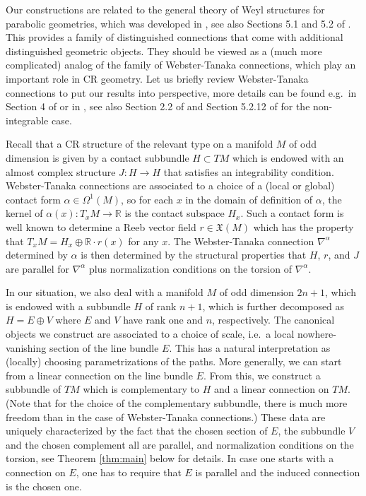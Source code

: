 \documentclass[11pt]{amsart}
\numberwithin{proposition}{section}
\numberwithin{equation}{section}
\begin{document}
Our constructions are related to the general theory of Weyl structures for parabolic geometries, which was developed in \cite{Weyl}, see also Sections 5.1 and 5.2 of \cite{Book}. This provides a family of distinguished connections that come with additional distinguished geometric objects. They should be viewed as a (much more complicated) analog of the family of Webster-Tanaka connections, which play an important role in CR geometry. Let us briefly review Webster-Tanaka connections to put our results into perspective, more details can be found e.g.\ in Section 4 of \cite{Lee} or in \cite{Go-Gr}, see also Section 2.2 of \cite{Arman} and Section 5.2.12 of \cite{Book} for the non-integrable case. 

Recall that a CR structure of the relevant type on a manifold $M$ of odd dimension is given by a contact subbundle $H\subset TM$ which is endowed with an almost complex structure $J:H\to H$ that satisfies an integrability condition. Webster-Tanaka connections are associated to a choice of a (local or global) contact form  $\alpha\in\Omega^1(M)$, so for each $x$ in the domain of definition of $\alpha$, the kernel of $\alpha(x):T_xM\to\mathbb R$ is the contact subspace $H_x$. Such a contact form is well known to determine a Reeb vector field $r\in\mathfrak X(M)$ which has the property that $T_xM=H_x\oplus\mathbb R\cdot r(x)$ for any $x$. The Webster-Tanaka connection $\nabla^\alpha$ determined by $\alpha$ is then determined by the structural properties that $H$, $r$, and $J$ are parallel for $\nabla^\alpha$ plus normalization conditions on the torsion of $\nabla^\alpha$. 

In our situation, we also deal with a manifold $M$ of odd dimension $2n+1$, which is endowed with a subbundle $H$ of rank $n+1$, which is further decomposed as $H=E\oplus V$ where $E$ and $V$ have rank one and $n$, respectively. The canonical objects we construct are associated to a choice of scale, i.e.\ a local nowhere-vanishing section of the line bundle $E$. This has a natural interpretation as (locally) choosing parametrizations of the paths. More generally, we can start from a linear connection on the line bundle $E$. From this, we construct a subbundle of $TM$ which is complementary to $H$ and a linear connection on $TM$. (Note that for the choice of the complementary subbundle, there is much more freedom than in the case of Webster-Tanaka connections.) These data are uniquely characterized by the fact that the chosen section of $E$, the subbundle $V$ and the chosen complement all are parallel, and normalization conditions on the torsion, see Theorem \ref{thm:main} below for details. In case one starts with a connection on $E$, one has to require that $E$ is parallel and the induced connection is the chosen one.  
\end{document}
